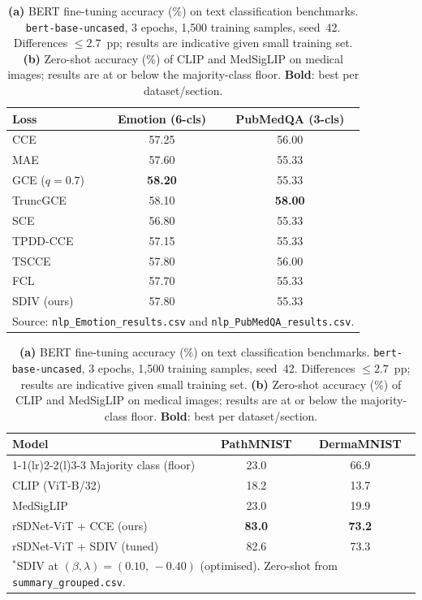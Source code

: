 \begin{table}[t]
\centering
\caption{%
\textbf{(a)} BERT fine-tuning accuracy (\%) on text classification benchmarks.
\texttt{bert-base-uncased}, 3 epochs, 1{,}500 training samples, seed~42.
Differences $\leq 2.7$~pp; results are indicative given small training set.
\textbf{(b)} Zero-shot accuracy (\%) of CLIP and MedSigLIP on medical images;
results are at or below the majority-class floor.
\textbf{Bold}: best per dataset/section.
}
\label{tab:nlp}
\small
\begin{tabular}{@{}lcc@{}}
\toprule
\textbf{Loss} & \textbf{Emotion} (6-cls) & \textbf{PubMedQA} (3-cls) \\
\midrule
CCE             & 57.25                    & 56.00              \\
MAE             & 57.60                    & 55.33              \\
GCE ($q{=}0.7$) & \textbf{58.20}          & 55.33              \\
TruncGCE        & 58.10                    & \textbf{58.00}     \\
SCE             & 56.80                    & 55.33              \\
TPDD-CCE        & 57.15                    & 55.33              \\
TSCCE           & 57.80                    & 56.00              \\
FCL             & 57.70                    & 55.33              \\
SDIV (ours)     & 57.80                    & 55.33              \\
\midrule
\multicolumn{3}{l}{\footnotesize
  Source: \texttt{nlp\_Emotion\_results.csv} and \texttt{nlp\_PubMedQA\_results.csv}.
}\\
\bottomrule
\end{tabular}

\vspace{8pt}

\begin{tabular}{@{}lcc@{}}
\toprule
\textbf{Model} & \textbf{PathMNIST} & \textbf{DermaMNIST} \\
\cmidrule(r){1-1}\cmidrule(lr){2-2}\cmidrule(l){3-3}
Majority class (floor)      & 23.0         & 66.9          \\
\midrule
CLIP (ViT-B/32)             & 18.2         & 13.7          \\
MedSigLIP                   & 23.0         & 19.9          \\
\midrule
rSDNet-ViT + CCE (ours)     & \textbf{83.0} & \textbf{73.2} \\
rSDNet-ViT + SDIV (tuned)   & 82.6          & 73.3          \\
\midrule
\multicolumn{3}{l}{\footnotesize
  $^{*}$SDIV at $(\beta,\lambda){=}(0.10,\,-0.40)$ (optimised).
  Zero-shot from \texttt{summary\_grouped.csv}.
}\\
\bottomrule
\end{tabular}
\end{table}

